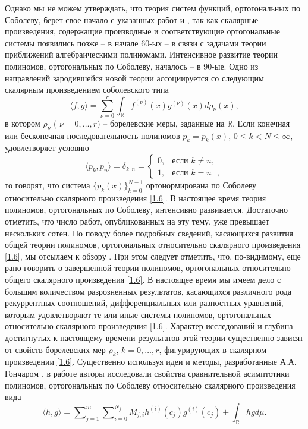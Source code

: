 Однако мы не можем утверждать, что теория систем функций, ортогональных по Соболеву, берет свое начало с указанных работ \cite{Faber} и \cite{Shauder}, так как скалярные произведения, содержащие производные и соответствующие ортогональные системы появились   \cite{Althammer} позже -- в начале 60-ых -- в связи с задачами теории приближений алгебраическими полиномами. Интенсивное развитие теории полиномов, ортогональных по Соболеву, началось   \cite{IserKoch} -- \cite{KwonLittl2} в  90-ые. Одно из направлений зародившейся новой теории ассоциируется со следующим скалярным произведением соболевского типа
\begin{equation}\label{1.6}
\langle f,g\rangle=\sum_{\nu=0}^r\int_{\mathbb{R}}f^{(\nu)}(x)g^{(\nu)}(x)d\rho_\nu(x),
\end{equation}
в котором $\rho_\nu$ ( $\nu=0,\ldots,r$) --  борелевские меры, заданные на $\mathbb{R}$. Если конечная или бесконечная  последовательность полиномов $p_k=p_k(x)$, $0\le k< N\le\infty$, удовлетворяет условию
\begin{equation}\label{1.7}
\langle p_k,p_n\rangle=\delta_{k,n}=\begin{cases}0,&\text{если $k\ne n$, }\\1,&\text{если $k= n$ }, \end{cases}
\end{equation}
то говорят, что система  $\{p_k(x)\}_{k=0}^{N-1}$ ортонормирована по Соболеву относительно скалярного произведения \eqref{1.6}. В настоящее время теория полиномов, ортогональных по Соболеву, интенсивно развивается. Достаточно отметить, что число работ, опубликованных  на эту тему, уже превышает нескольких сотен. По поводу более подробных сведений, касающихся развития общей теории полиномов, ортогональных относительно скалярного произведения \eqref{1.6}, мы отсылаем к обзору \cite{MarcelXu}. При этом следует отметить, что, по-видимому, еще рано говорить о завершенной теории полиномов, ортогональных относительно общего скалярного произведения \eqref{1.6}. В настоящее время мы имеем дело с большим количеством разрозненных результатов, касающихся различного рода рекуррентных соотношений, дифференциальных или разностных уравнений, которым удовлетворяют те или иные системы полиномов, ортогональных относительно скалярного произведения \eqref{1.6}. Характер исследований и глубина достигнутых к настоящему времени результатов этой теории существенно зависят от свойств борелевских мер $\rho_k$, $k=0,\ldots, r$, фигурирующих в скалярном произведении \eqref{1.6}. Существенно используя идеи и методы, разработанные А.А. Гончаром \cite{Gonchar1975}, в работе \cite{Lopez1995} авторы исследовали свойства сравнительной асимптотики полиномов, ортогональных по Соболеву относительно скалярного произведения вида
$$
\langle h,g\rangle=\sum\nolimits_{j=1}^m\sum\nolimits_{i=0}^{N_j}M_{j,i}h^{(i)}(c_j)g^{(i)}(c_j)+\int_{\mathbb{R}}hgd\mu.
$$

